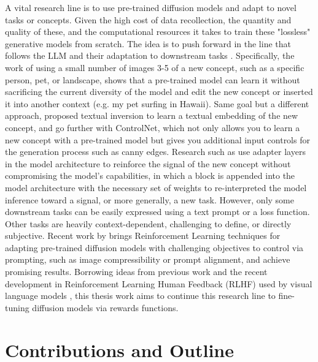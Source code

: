 A vital research line is to use pre-trained diffusion models and adapt to novel tasks or concepts. Given the high cost of data recollection, the quantity and quality of these, and the computational resources it takes to train these "lossless" generative models from scratch. The idea is to push forward in the line that follows the LLM and their adaptation to downstream tasks \citep{Radford2019LanguageMA}. Specifically, the work of \cite{ruiz2023dreambooth} using a small number of images 3-5 of a new concept, such as a specific person, pet, or landscape, shows that a pre-trained model can learn it without sacrificing the current diversity of the model and edit the new concept or inserted it into another context (e.g. my pet surfing in Hawaii). Same goal but a different approach, \cite{gal2022image} proposed textual inversion to learn a textual embedding of the new concept, and \cite{zhang2023adding} go further with ControlNet, which not only allows you to learn a new concept with a pre-trained model but gives you additional input controls for the generation process such as canny edges. Research such as \cite{shi2023instantbooth} use adapter layers in the model architecture to reinforce the signal of the new concept without compromising the model's capabilities, in which a block is appended into the model architecture with the necessary set of weights to re-interpreted the model inference toward a signal, or more generally, a new task. However, only some downstream tasks can be easily expressed using a text prompt or a loss function. Other tasks are heavily context-dependent, challenging to define, or directly subjective. Recent work by \cite{black2023training} brings Reinforcement Learning techniques for adapting pre-trained diffusion models with challenging objectives to control via prompting, such as image compressibility or prompt alignment, and achieve promising results. Borrowing ideas from previous work and the recent development in Reinforcement Learning Human Feedback (RLHF) used by visual language models \citep{lee2023aligning}, this thesis work aims to continue this research line to fine-tuning diffusion models via rewards functions. \\

\section{Contributions and Outline}


